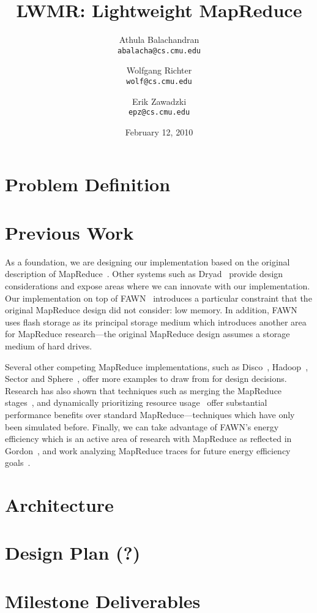 \documentclass[10pt,letter,final,article,twocolumn]{article} %
\title{LWMR: Lightweight MapReduce}
\author{Athula Balachandran \\
{\tt abalacha@cs.cmu.edu}
\and
Wolfgang Richter \\
{\tt wolf@cs.cmu.edu}
\and
Erik Zawadzki \\
{\tt epz@cs.cmu.edu}}
\date{February 12, 2010} %
\begin{document}
\pagestyle{empty}
\maketitle
\thispagestyle{empty}

\section{Problem Definition}

\section{Previous Work}

As a foundation, we are designing our implementation based on the original 
description of MapReduce~\cite{mapreduce08}.  Other systems such as
Dryad~\cite{dryad07} provide design considerations and expose areas
where we can innovate with our implementation.  Our implementation on top
of FAWN~\cite{fawn09} introduces a particular constraint that the original
MapReduce design did not consider: low memory.  In addition, FAWN uses
flash storage as its principal storage medium which introduces another
area for MapReduce research---the original MapReduce design assumes a
storage medium of hard drives.  

Several other competing MapReduce implementations, such as
Disco~\cite{disco10}, Hadoop~\cite{hadoop10}, Sector and
Sphere~\cite{sphere09}, offer more examples to draw from for design
decisions.  Research has also shown that techniques such as merging the
MapReduce stages~\cite{barrier10}, and dynamically prioritizing resource
usage~\cite{sandholm09} offer substantial performance benefits over
standard MapReduce---techniques which have only been simulated before. 
Finally, we can take advantage of FAWN's energy efficiency which is an active
area of research with MapReduce as reflected in Gordon~\cite{gordon09}, 
and work analyzing MapReduce traces for future energy efficiency goals~\cite{chen10}.

\section{Architecture}

\section{Design Plan (?)}

\section{Milestone Deliverables}



\end{document}
